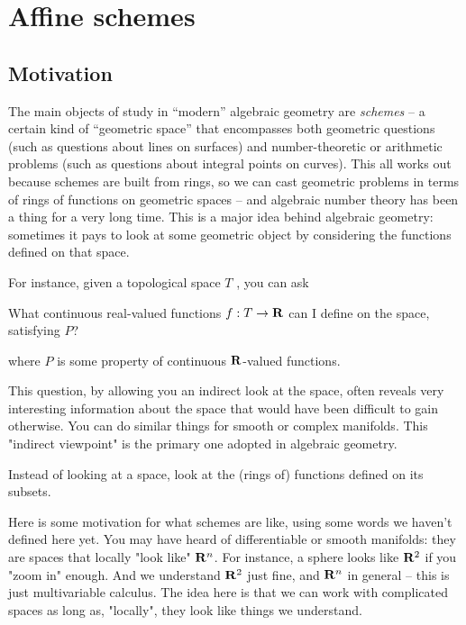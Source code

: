 \chapter{Affine schemes}

\section{Motivation}%
\label{sec:motivation-for-affine-schemes}

The main objects of study in ``modern'' algebraic geometry are \emph{schemes} -- a
certain kind of ``geometric space'' that encompasses both geometric questions
(such as questions about lines on surfaces) and number-theoretic or arithmetic
problems (such as questions about integral points on curves). This all works out
because schemes are built from rings, so we can cast geometric problems in terms
of rings of functions on geometric spaces -- and algebraic number theory has
been a thing for a very long time. This is a major idea behind algebraic
geometry: sometimes it pays to look at some geometric object by considering the
functions defined on that space.

\medskip\noindent For instance, given a topological space $T$ , you can ask

\begin{question}
  What continuous real-valued functions $f:T\to\mathbf{R}$ can I define on the space,
  satisfying $P$?
\end{question}
where $P$ is some property of continuous $\mathbf{R}$-valued functions.

\medskip\noindent This question, by allowing you an indirect look at the space,
often reveals very interesting information about the space that would have been
difficult to gain otherwise. You can do similar things for smooth or complex
manifolds. This "indirect viewpoint" is the primary one adopted in algebraic
geometry.

\begin{slogan}
  Instead of looking at a space, look at the (rings of) functions defined on its
  subsets.
\end{slogan}

Here is some motivation for what schemes are like, using some words we haven't
defined here yet. You may have heard of differentiable or smooth manifolds: they
are spaces that locally "look like" $\mathbf{R}^n$. For instance, a sphere looks like
$\mathbf{R}^2$ if you "zoom in" enough. And we understand $\mathbf{R}^2$ just fine, and
$\mathbf{R}^n$ in general -- this is just multivariable calculus. The idea here is that
we can work with complicated spaces as long as, "locally", they look like things
we understand.

